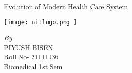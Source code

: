\documentclass[12pt]{article}
\begin{document}
\begin{center}
\huge\underline{Evolution of Modern Health Care System}
\end{center}
\begin{center}
 \texttt{[image: nitlogo.png ]}
\end{center}
\vspace{1cm}
\begin{center}
   \emph{\large By}\\
\Large{ PIYUSH BISEN }\\
\large{Roll No- 21111036}\\
\large{Biomedical 1st Sem}\\
\end{center}
\\
\\
\\
\end{document}
